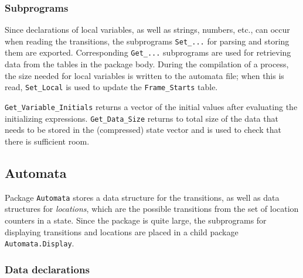 \documentclass[11pt]{article}
\newcommand*{\p}[1]{\texttt{#1}}
\begin{document}
\subsubsection*{Subprograms}

Since declarations of local variables, as well as strings, numbers,
etc., can occur when reading the transitions, the subprograms
\p{Set\_...} for parsing and storing them are exported. Corresponding
\p{Get\_...} subprograms are used for retrieving data from the tables in
the package body. During the compilation of a process, the size needed
for local variables is written to the automata file; when this is read,
\p{Set\_Local} is used to update the \p{Frame\_Starts} table.

\p{Get\_Variable\_Initials} returns a vector of the initial values after
evaluating the initializing expressions. \p{Get\_Data\_Size} returns to
total size of the data that needs to be stored in the (compressed) state
vector and is used to check that there is sufficient room.

\subsection{Automata}

Package \p{Automata} stores a data structure for the transitions, as
well as data structures for \emph{locations}, which are the possible
transitions from the set of location counters in a state. Since the
package is quite large, the subprograms for displaying transitions and
locations are placed in a child package \p{Automata.Display}.

\subsubsection*{Data declarations}
\end{document}
